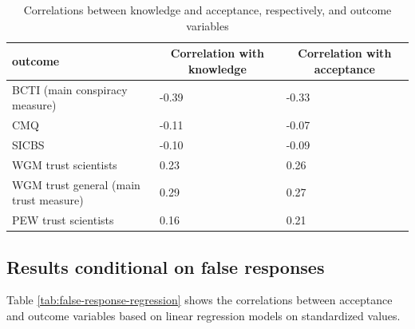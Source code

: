 \documentclass[
  doc,floatsintext]{apa6}
\begin{document}
\begin{table}[tbp]

\begin{center}
\begin{threeparttable}

\caption{\label{tab:correlations-outcomes}Correlations between knowledge and acceptance, respectively, and outcome variables}

\begin{tabular}{lll}
\toprule
outcome & \multicolumn{1}{c}{Correlation with knowledge} & \multicolumn{1}{c}{Correlation with acceptance}\\
\midrule
BCTI 
(main conspiracy measure) & -0.39 & -0.33\\
CMQ & -0.11 & -0.07\\
SICBS & -0.10 & -0.09\\
WGM trust scientists & 0.23 & 0.26\\
WGM trust general 
(main trust measure) & 0.29 & 0.27\\
PEW trust scientists & 0.16 & 0.21\\
\bottomrule
\end{tabular}

\end{threeparttable}
\end{center}

\end{table}

\hypertarget{results-conditional-on-false-responses}{%
\subsection{Results conditional on false responses}\label{results-conditional-on-false-responses}}

Table \ref{tab:false-response-regression} shows the correlations between acceptance and outcome variables based on linear regression models on standardized values.
\end{document}

